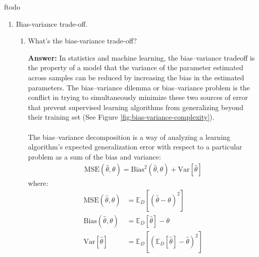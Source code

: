 ƒtodo\documentclass{article}
\newenvironment{QandA}{\begin{enumerate}[label=\arabic*.]}{\end{enumerate}}
\newenvironment{InnerQandA}{\begin{enumerate}[label=\roman*.]}{\end{enumerate}}
\newenvironment{answer}{\par\normalfont \textbf{Answer:}}{}
\begin{document}
\begin{QandA}
    \item Bias-variance trade-off.
    \begin{InnerQandA}
        \item What’s the bias-variance trade-off?
        \begin{answer}
            In statistics and machine learning, the bias–variance tradeoff is the property of a model that the variance of the parameter estimated across samples can be reduced by increasing the bias in the estimated parameters. The bias–variance dilemma or bias–variance problem is the conflict in trying to simultaneously minimize these two sources of error that prevent supervised learning algorithms from generalizing beyond their training set (See Figure \ref{fig:bias-variance-complexity}).\\\\
            The bias–variance decomposition is a way of analyzing a learning algorithm's expected generalization error with respect to a particular problem as a sum of the bias and variance:
            \begin{align*}
                \text{MSE}\left(\hat{\theta}, \theta\right) = \text{Bias}^2\left(\hat{\theta}, \theta\right) + \text{Var}\left[ \hat{\theta} \right]
            \end{align*}
            where:
            \begin{align*}
                \text{MSE}\left(\hat{\theta}, \theta\right) &= \mathbb{E}_{D} \left[(\hat{\theta} - \theta)^2\right] \\
                \text{Bias}\left(\hat{\theta}, \theta \right) &= \mathbb{E}_{D}\left[\hat{\theta}\right] - \theta \\
                \text{Var}\left[\hat{\theta}\right] &= \mathbb{E}_{D} \left[ \left( \mathbb{E}_{D}\left[ \hat{\theta} \right] - \hat{\theta} \right)^2 \right]
            \end{align*}


\end{answer}
\end{InnerQandA}
\end{QandA}
\end{document}
